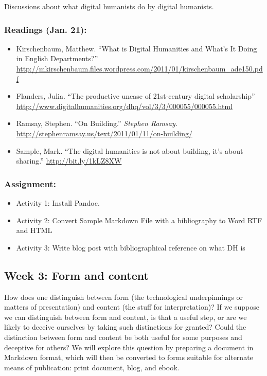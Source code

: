 \documentclass[]{article}
\begin{document}
Discussions about what digital humanists do by digital humanists.

\subsubsection{Readings (Jan. 21):}\label{readings-jan.-21}

\begin{itemize}
\itemsep1pt\parskip0pt
\item
  Kirschenbaum, Matthew. ``What is Digital Humanities and What's It
  Doing in English Departments?''
  \url{http://mkirschenbaum.files.wordpress.com/2011/01/kirschenbaum_ade150.pdf}
\item
  Flanders, Julia. ``The productive unease of 21st-century digital
  scholarship''
  \url{http://www.digitalhumanities.org/dhq/vol/3/3/000055/000055.html}
\item
  Ramsay, Stephen. ``On Building.'' \emph{Stephen Ramsay.}
  \url{http://stephenramsay.us/text/2011/01/11/on-building/}
\item
  Sample, Mark. ``The digital humanities is not about building, it's
  about sharing.'' \url{http://bit.ly/1kLZ8XW}
\end{itemize}

\subsubsection{Assignment:}\label{assignment-1}

\begin{itemize}
\itemsep1pt\parskip0pt
\item
  Activity 1: Install Pandoc.
\item
  Activity 2: Convert Sample Markdown File with a bibliography to Word
  RTF and HTML
\item
  Activity 3: Write blog post with bibliographical reference on what DH
  is
\end{itemize}

\subsection{Week 3: Form and content}\label{week-3-form-and-content}

How does one distinguish between form (the technological underpinnings
or matters of presentation) and content (the stuff for interpretation)?
If we suppose we can distinguish between form and content, is that a
useful step, or are we likely to deceive ourselves by taking such
distinctions for granted? Could the distinction between form and content
be both useful for some purposes and deceptive for others? We will
explore this question by preparing a document in Markdown format, which
will then be converted to forms suitable for alternate means of
publication: print document, blog, and ebook.
\end{document}
